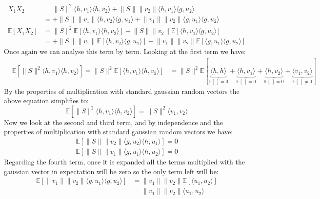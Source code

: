\newcommand{\pexp}[1]{\mathds{E}\left[#1\right]}
\newcommand{\norm}[1]{\lVert #1 \rVert}
\newcommand{\dotprod}[1]{\langle #1 \rangle}
\begin{align*}
    X_1X_2 &= \lVert S \rVert^2 \langle h, v_1\rangle \langle h, v_2 \rangle + \lVert S \rVert \lVert v_2 \rVert \langle h, v_1 \rangle \langle g, u_2 \rangle \\ 
           &= +\lVert S \rVert \lVert v_1 \rVert \langle h, v_2 \rangle \langle g, u_1 \rangle + \lVert v_1 \rVert \lVert v_2 \rVert \langle g, u_1 \rangle \langle g, u_2 \rangle \\
    \pexp{X_1X_2} &= \lVert S \rVert^2\pexp{\langle h, v_1 \rangle \langle h, v_2\rangle} + \lVert S \rVert \lVert v_2\rVert \pexp{\langle h, v_1 \rangle \langle g, u_2 \rangle} \\ 
                  &= + \lVert S \rVert \lVert v_1 \rVert \pexp{\langle h, v_2 \rangle \langle g, u_1 \rangle} + \lVert v_1 \rVert \lVert v_2 \rVert \pexp{\langle g, u_1 \rangle \langle g, u_2 \rangle}
\end{align*}
Once again we can analyse this term by term. Looking at the first term we have:
\begin{align*}
    &\pexp{\lVert S \rVert^2 \langle h, v_1 \rangle \langle h, v_2 \rangle} = \lVert S \rVert^2 \pexp{\langle h, v_1 \rangle \langle h, v_2 \rangle}
    &= \lVert S \rVert^2 \pexp{\underbrace{\langle h,h\rangle}_{\pexp{\cdot} = 0} + \underbrace{\langle h, v_1 \rangle}_{\pexp{\cdot} = 0} + \underbrace{\langle h, v_2 \rangle}_{\pexp{\cdot} = 0} + \underbrace{\langle v_1, v_2 \rangle}_{\pexp{\cdot} \neq 0}}
\end{align*}
By the properties of multiplication with standard gaussian random vectors the above equation simplifies to:
\begin{equation*}
    \pexp{\lVert S \rVert^2 \langle h, v_1 \rangle \langle h, v_2 \rangle} = \norm{S}^2\dotprod{v_1, v_2}
\end{equation*}
Now we look at the second and third term, and by independence and the properties of multiplication with standard gaussian random vectors we have:
\begin{align*}
    \pexp{\norm{S}\norm{v_2}\dotprod{g, u_2}\dotprod{h,u_1}} = 0 \\
    \pexp{\norm{S}\norm{v_1}\dotprod{g, u_1}\dotprod{h,u_2}} = 0 
\end{align*}
Regarding the fourth term, once it is expanded all the terms multiplied with the gaussian vector in expectation will be
zero so the only term left will be:
\begin{align*}
    \pexp{\norm{v_1}\norm{v_2}\dotprod{g, u_1}\dotprod{g, u_2}} &= \norm{v_1}\norm{v_2}\pexp{\dotprod{u_1, u_2}} \\
                                                                &= \norm{v_1}\norm{v_2}\dotprod{u_1, u_2}
\end{align*}
